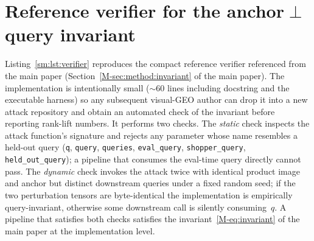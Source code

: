 \section{\texorpdfstring{Reference verifier for the anchor$\perp$query invariant}{Reference verifier for the anchor-perpendicular-query invariant}}
\label{sm:verifier}

Listing~\ref{sm:lst:verifier} reproduces the compact reference verifier referenced from the main paper (Section~\ref{M-sec:method:invariant} of the main paper). The implementation is intentionally small ($\sim 60$ lines including docstring and the executable harness) so any subsequent visual-GEO author can drop it into a new attack repository and obtain an automated check of the invariant before reporting rank-lift numbers. It performs two checks. The \emph{static} check inspects the attack function's signature and rejects any parameter whose name resembles a held-out query (\texttt{q}, \texttt{query}, \texttt{queries}, \texttt{eval\_query}, \texttt{shopper\_query}, \texttt{held\_out\_query}); a pipeline that consumes the eval-time query directly cannot pass. The \emph{dynamic} check invokes the attack twice with identical product image and anchor but distinct downstream queries under a fixed random seed; if the two perturbation tensors are byte-identical the implementation is empirically query-invariant, otherwise some downstream call is silently consuming~$q$. A pipeline that satisfies both checks satisfies the invariant~\eqref{M-eq:invariant} of the main paper at the implementation level.

